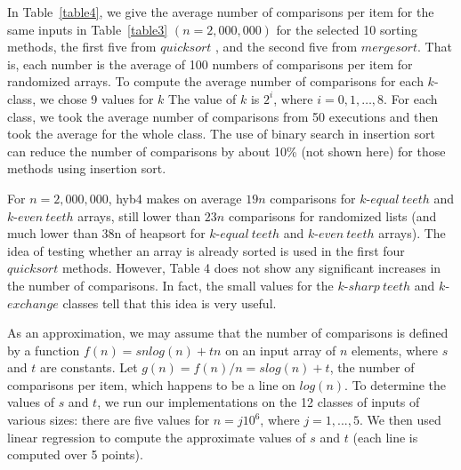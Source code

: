 \documentclass[AMA,STIX1COL]{WileyNJD-v2}
\newcommand{\keq}{$k$-$equal\ teeth$ }
\newcommand{\kev}{$k$-$even\ teeth$ }
\newcommand{\ksha}{$k$-$sharp\ teeth$ }
\newcommand{\kexc}{$k$-$exchange$ }
\newcommand{\qusort}{$quicksort$ }
\newcommand{\msortn}{$mergesort$}
\begin{document}
In Table~\ref{table4}, we give the average number of comparisons per item for the same inputs in Table~\ref{table3} $(n = 2,000,000)$ for the selected 10 sorting methods, the first five from \qusort, and the second five from \msortn. 
That is, each number is the average of 100 numbers of comparisons per item for randomized arrays. 
To compute the average number of comparisons for each $k$-class, we chose 9 values for $k$ The value of $k$ is $2^i$, where $i = 0, 1, …, 8$. 
For each class, we took the average number of comparisons from 50 executions and then took the average for the whole class. 
The use of binary search in insertion sort can reduce the number of comparisons by about 10\% (not shown here) for those methods using insertion sort.

For $n = 2,000,000$, hyb4 makes on average $19n$ comparisons for \keq and \kev arrays, still lower than $23n$ comparisons for randomized lists (and much lower than 38n of heapsort for \keq and \kev arrays). 
The idea of testing whether an array is already sorted is used in the first four \qusort methods. 
However, Table 4 does not show any significant increases in the number of comparisons. 
In fact, the small values for the \ksha and \kexc classes tell that this idea is very useful.

As an approximation, we may assume that the number of comparisons is defined by a function $f(n) = snlog(n) + tn$ on an input array of $n$ elements, where $s$ and $t$ are constants. Let $g(n) = f(n)/n = slog(n) + t$, the number of comparisons per item, which happens to be a line on $log(n)$. 
To determine the values of $s$ and $t$, we run our implementations on the 12 classes of inputs of various sizes: there are five values for $n = j10^6$, where $j = 1, ..., 5$. 
We then used linear regression to compute the approximate values of $s$ and $t$ (each line is computed over 5 points).
\end{document}
